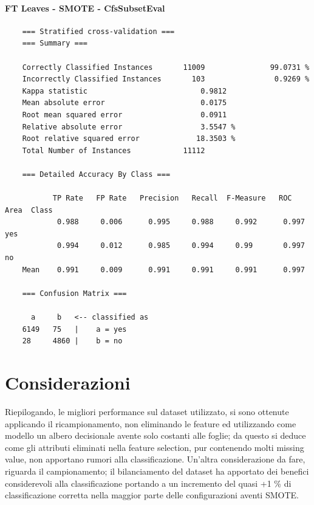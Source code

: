 \paragraph{FT Leaves - SMOTE - CfsSubsetEval}
{\scriptsize
	\begin{verbatim}
	=== Stratified cross-validation ===
	=== Summary ===
	
	Correctly Classified Instances       11009               99.0731 %
	Incorrectly Classified Instances       103                0.9269 %
	Kappa statistic                          0.9812
	Mean absolute error                      0.0175
	Root mean squared error                  0.0911
	Relative absolute error                  3.5547 %
	Root relative squared error             18.3503 %
	Total Number of Instances            11112     
	
	=== Detailed Accuracy By Class ===
	
	       TP Rate   FP Rate   Precision   Recall  F-Measure   ROC Area  Class
	        0.988     0.006      0.995     0.988     0.992      0.997    yes
	        0.994     0.012      0.985     0.994     0.99       0.997    no
	Mean    0.991     0.009      0.991     0.991     0.991      0.997
	
	=== Confusion Matrix ===
	
	  a     b   <-- classified as
	6149   75   |    a = yes
	28     4860 |    b = no	
	\end{verbatim}
}
\pagebreak
\section{Considerazioni}
Riepilogando, le migliori performance sul dataset utilizzato, si sono ottenute applicando il ricampionamento, non eliminando le feature ed utilizzando come modello un albero decisionale avente solo costanti alle foglie; da questo si deduce come gli attributi eliminati nella feature selection, pur contenendo molti missing value, non apportano rumori alla classificazione.
Un'altra considerazione da fare, riguarda il campionamento; il bilanciamento del dataset ha apportato dei benefici considerevoli alla classificazione portando a un incremento del quasi +1 \% di classificazione corretta nella maggior parte delle configurazioni aventi SMOTE.


